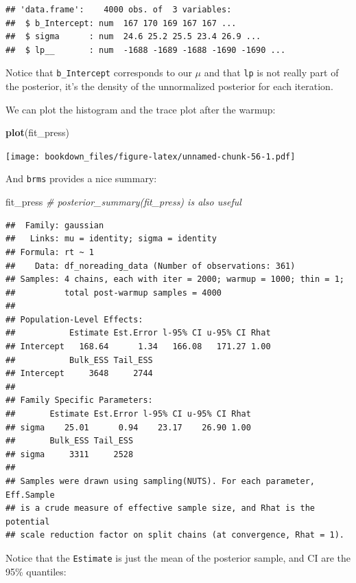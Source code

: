\documentclass[12pt,]{krantz}
\newenvironment{Shaded}{\begin{snugshade}}{\end{snugshade}}
\newcommand{\CommentTok}[1]{\textcolor[rgb]{0.56,0.35,0.01}{\textit{#1}}}
\newcommand{\KeywordTok}[1]{\textcolor[rgb]{0.13,0.29,0.53}{\textbf{#1}}}
\newcommand{\NormalTok}[1]{#1}
\theoremstyle{definition}
\theoremstyle{definition}
\theoremstyle{definition}
\theoremstyle{remark}
\begin{document}
\begin{verbatim}
## 'data.frame':    4000 obs. of  3 variables:
##  $ b_Intercept: num  167 170 169 167 167 ...
##  $ sigma      : num  24.6 25.2 25.5 23.4 26.9 ...
##  $ lp__       : num  -1688 -1689 -1688 -1690 -1690 ...
\end{verbatim}

Notice that \texttt{b\_Intercept} corresponds to our \(\mu\) and that \texttt{lp} is not really part of the posterior, it's the density of the unnormalized posterior for each iteration.

We can plot the histogram and the trace plot after the warmup:

\begin{Shaded}
\begin{Highlighting}[]
\KeywordTok{plot}\NormalTok{(fit_press)}
\end{Highlighting}
\end{Shaded}

\texttt{[image: bookdown\_files/figure-latex/unnamed-chunk-56-1.pdf]}

And \texttt{brms} provides a nice summary:

\begin{Shaded}
\begin{Highlighting}[]
\NormalTok{fit_press}
\CommentTok{# posterior_summary(fit_press) is also useful}
\end{Highlighting}
\end{Shaded}

\begin{verbatim}
##  Family: gaussian 
##   Links: mu = identity; sigma = identity 
## Formula: rt ~ 1 
##    Data: df_noreading_data (Number of observations: 361) 
## Samples: 4 chains, each with iter = 2000; warmup = 1000; thin = 1;
##          total post-warmup samples = 4000
## 
## Population-Level Effects: 
##           Estimate Est.Error l-95% CI u-95% CI Rhat
## Intercept   168.64      1.34   166.08   171.27 1.00
##           Bulk_ESS Tail_ESS
## Intercept     3648     2744
## 
## Family Specific Parameters: 
##       Estimate Est.Error l-95% CI u-95% CI Rhat
## sigma    25.01      0.94    23.17    26.90 1.00
##       Bulk_ESS Tail_ESS
## sigma     3311     2528
## 
## Samples were drawn using sampling(NUTS). For each parameter, Eff.Sample 
## is a crude measure of effective sample size, and Rhat is the potential 
## scale reduction factor on split chains (at convergence, Rhat = 1).
\end{verbatim}

Notice that the \texttt{Estimate} is just the mean of the posterior sample, and
CI are the 95\% quantiles:
\end{document}
